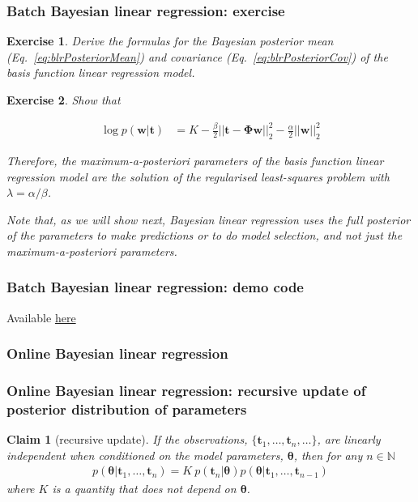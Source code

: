 \documentclass[11pt]{beamer}
\newtheorem{claim}{Claim}
\newtheorem{probExercise}{Exercise}
\begin{document}
\begin{frame}
    \frametitle{Batch Bayesian linear regression: exercise}

    \scriptsize
    \begin{probExercise}
		Derive the formulas for the Bayesian posterior mean
(Eq.~\ref{eq:blrPosteriorMean}) and covariance (Eq.~\ref{eq:blrPosteriorCov})
of the basis function linear regression model.
    \end{probExercise}

    \begin{probExercise}
        Show that

        \begin{align}
            \log p(\mathbf{w}|\boldsymbol{t})&=K-\frac{\beta}{2}||\mathbf{t}-\boldsymbol{\Phi}\mathbf{w}||_2^2-\frac{\alpha}{2}||\mathbf{w}||_2^2
        \end{align}

        Therefore, the maximum-a-posteriori parameters of the basis function
        linear regression model are the solution of the regularised
        least-squares problem with $\lambda=\alpha/\beta$.

        Note that, as we will show next, Bayesian linear regression uses the
        full posterior of the parameters to make predictions or to do model
        selection, and not just the maximum-a-posteriori parameters.

    \end{probExercise}
    \normalsize

\end{frame}

\begin{frame}
    \frametitle{Batch Bayesian linear regression: demo code}
    Available \href{https://joacorapela.github.io/gcnuBridging2023/auto\_examples/bayesianLinearRegression/plotBatchBayesianLinearRegression.html\#sphx-glr-auto-examples-bayesianlinearregression-plotbatchbayesianlinearregression-py}{here}
\end{frame}

\subsubsection{Online Bayesian linear regression}

\begin{frame}
    \frametitle{Online Bayesian linear regression: recursive update of posterior distribution of parameters}
	\scriptsize
	\begin{claim}[recursive update]
		If the observations, $\{\mathbf{t}_1,\ldots,\mathbf{t}_n,\dots\}$, are linearly independent when conditioned on the model parameters, $\boldsymbol{\theta}$, then for any $n\in\mathbb{N}$
		\begin{align}
			p(\boldsymbol{\theta}|\mathbf{t}_1,\ldots,\mathbf{t}_n)=K\ p(\mathbf{t}_n|\boldsymbol{\theta})p(\boldsymbol{\theta}|\mathbf{t}_1,\ldots,\mathbf{t}_{n-1})
		\end{align}
		where $K$ is a quantity that does not depend on $\boldsymbol{\theta}$.
	\end{claim}
	\normalsize
\end{frame}
\end{document}
